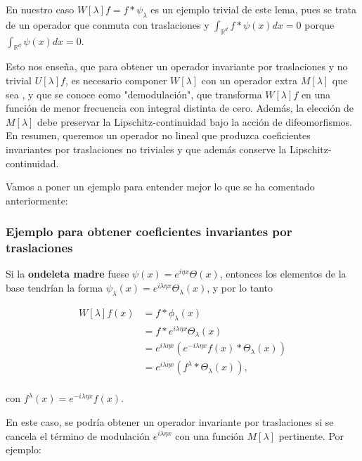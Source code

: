 \noindent En nuestro caso $W[\lambda]f=f\ast\psi_\lambda$ es un ejemplo trivial de este lema, pues se trata de un operador que conmuta con traslaciones y $\int_{\mathbb{R}^d} f \ast \psi(x) dx=0$ porque $\int_{\mathbb{R}^d} \psi(x)dx=0$.

\medskip

\noindent Esto nos enseña, que para obtener un operador invariante por traslaciones y no trivial $U[\lambda]f$, es necesario componer $W[\lambda]$ con un operador extra $M[\lambda]$ que sea , y que se conoce como "demodulación", que transforma $W[\lambda]f$ en una función de menor frecuencia con integral distinta de cero. Además, la elección de $M[\lambda]$ debe preservar la Lipschitz-continuidad bajo la acción de difeomorfismos.    
En resumen, queremos un operador no lineal que produzca coeficientes invariantes por traslaciones no triviales y que además conserve la Lipschitz-continuidad.


\medskip

\noindent Vamos a poner un ejemplo para entender mejor lo que se ha comentado anteriormente: 

\subsubsection{Ejemplo para obtener coeficientes invariantes por traslaciones}

\noindent Si la \textbf{ondeleta madre} fuese $\psi(x)=e^{i\eta x}\Theta(x)$, entonces los elementos de la base tendrían la forma $\psi_\lambda(x)=e^{i\lambda\eta x}\Theta_\lambda(x)$, y por lo tanto 


\begin{align} \label{eq::1.4}
  W[\lambda]f(x) &= f \ast \phi_\lambda (x) \\
  &= f \ast e^{i\lambda\eta x}\Theta_\lambda(x) \\
  &=e^{i\lambda\eta x}(e^{-i\lambda\eta x}f(x) \ast \Theta_\lambda(x)) \\
  &=e^{i\lambda\eta x}(f^\lambda \ast \Theta_\lambda(x)),\\
\end{align}

\noindent con $f^\lambda(x)=e^{-i\lambda\eta x}f(x)$.

\medskip

\noindent En este caso, se podría obtener un operador invariante por traslaciones si se cancela el término de modulación $e^{i\lambda\eta x}$ con una función $M[\lambda]$ pertinente. Por ejemplo: 

